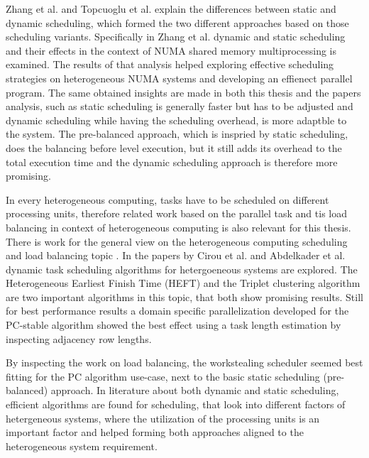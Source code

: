 Zhang et al. \cite{zhangDynamicStaticLoad1991} and Topcuoglu et al. \cite{topcuogluPerformanceeffectiveLowcomplexityTask2002} explain the differences between static and dynamic scheduling, which formed the two different approaches based on those scheduling variants. Specifically in Zhang et al. \cite{zhangDynamicStaticLoad1991} dynamic and static scheduling and their effects in the context of NUMA shared memory multiprocessing is examined. The results of that analysis helped exploring effective scheduling strategies on heterogeneous NUMA systems and developing an effienect parallel program. The same obtained insights are made in both this thesis and the papers analysis, such as static scheduling is generally faster but has to be adjusted and dynamic scheduling while having the scheduling overhead, is more adaptble to the system.
The pre-balanced approach, which is inspried by static scheduling, does the balancing before level execution, but it still adds its overhead to the total execution time and the dynamic scheduling approach is therefore more promising.

In every heterogeneous computing, tasks have to be scheduled on different processing units, therefore related work based on the parallel task and tis load balancing in context of heterogeneous computing is also relevant for this thesis. There is work for the general view on the heterogeneous computing scheduling and load balancing topic \cite{cirouTripletClusteringScheduling2001, abdelkaderDynamicTaskScheduling2012,binottoDynamicReconfigurableLoadbalancing2010,galindoDynamicLoadBalancing2008,kopetzRealTimeScheduling1997,kwokStaticSchedulingAlgorithms1999,momcilovicDynamicLoadBalancing2014,singhSurveyStaticScheduling2015}. In the papers by Cirou et al. \cite{cirouTripletClusteringScheduling2001} and Abdelkader et al. \cite{abdelkaderDynamicTaskScheduling2012} dynamic task scheduling algorithms for hetergoeneous systems are explored. The Heterogeneous Earliest Finish Time (HEFT) and the Triplet clustering algorithm are two important algorithms in this topic, that both show promising results. Still for best performance results a domain specific parallelization developed for the PC-stable algorithm showed the best effect using a task length estimation by inspecting adjacency row lengths.

By inspecting the work on load balancing, the workstealing scheduler seemed best fitting for the PC algorithm use-case, next to the basic static scheduling (pre-balanced) approach. In literature about both dynamic and static scheduling, efficient algorithms are found for scheduling, that look into different factors of hetergeneous systems, where the utilization of the processing units is an important factor and helped forming both approaches aligned to the heterogeneous system requirement. 

